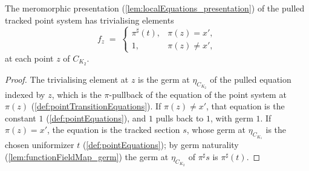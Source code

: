 \begin{lemma}
  \label{lem:pointTransitionEquations_elem}
  \leanok
  The meromorphic presentation (\ref{lem:localEquations_presentation}) of the pulled
  tracked point system has trivialising elements
  \[
    f_z \;=\;
    \begin{cases}
      \pi^{\sharp}(t), & \pi(z) = x', \\
      1, & \pi(z) \neq x',
    \end{cases}
  \]
  at each point \(z\) of \(C_{K_2}\).
\end{lemma}
\begin{proof}
  \leanok
  The trivialising element at \(z\) is the germ at \(\eta_{C_{K_2}}\) of the pulled
  equation indexed by \(z\), which is the \(\pi\)-pullback of the equation of the
  point system at \(\pi(z)\) (\ref{def:pointTransitionEquations}). If
  \(\pi(z) \neq x'\), that equation is the constant \(1\)
  (\ref{def:pointEquations}), and \(1\) pulls back to \(1\), with germ \(1\). If
  \(\pi(z) = x'\), the equation is the tracked section \(s\), whose germ at
  \(\eta_{C_{K_1}}\) is the chosen uniformizer \(t\) (\ref{def:pointEquations});
  by germ naturality (\ref{lem:functionFieldMap_germ}) the germ at
  \(\eta_{C_{K_2}}\) of \(\pi^{\sharp}s\) is \(\pi^{\sharp}(t)\).
\end{proof}

